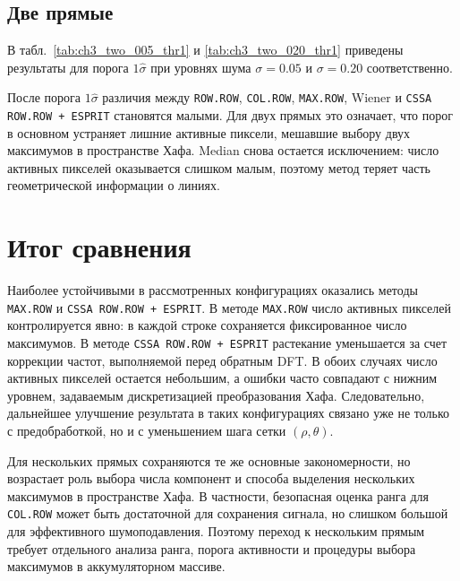 \subsection{Две прямые}

В табл.~\ref{tab:ch3_two_005_thr1} и \ref{tab:ch3_two_020_thr1} приведены
результаты для порога $1\hat\sigma$ при уровнях шума $\sigma=0.05$ и
$\sigma=0.20$ соответственно.





После порога $1\hat\sigma$ различия между \texttt{ROW.ROW},
\texttt{COL.ROW}, \texttt{MAX.ROW}, Wiener и
\texttt{CSSA ROW.ROW + ESPRIT} становятся малыми. Для двух прямых это означает,
что порог в основном устраняет лишние активные пиксели, мешавшие выбору двух
максимумов в пространстве Хафа. Median снова остается исключением: число
активных пикселей оказывается слишком малым, поэтому метод теряет часть
геометрической информации о линиях.

\section{Итог сравнения}
Наиболее устойчивыми в рассмотренных конфигурациях оказались методы
\texttt{MAX.ROW} и \texttt{CSSA ROW.ROW + ESPRIT}. В методе
\texttt{MAX.ROW} число активных пикселей контролируется явно: в каждой строке
сохраняется фиксированное число максимумов. В методе
\texttt{CSSA ROW.ROW + ESPRIT} растекание уменьшается за счет коррекции
частот, выполняемой перед обратным DFT. В обоих случаях число активных
пикселей остается небольшим, а ошибки часто совпадают с нижним
уровнем, задаваемым дискретизацией преобразования Хафа. Следовательно,
дальнейшее улучшение результата в таких конфигурациях связано уже не только с
предобработкой, но и с уменьшением шага сетки $(\rho,\theta)$.

Для нескольких прямых сохраняются те же основные закономерности, но возрастает
роль выбора числа компонент и способа выделения нескольких максимумов в
пространстве Хафа. В частности, безопасная оценка ранга для
\texttt{COL.ROW} может быть достаточной для сохранения сигнала, но слишком
большой для эффективного шумоподавления. Поэтому переход к нескольким прямым
требует отдельного анализа ранга, порога активности и процедуры выбора
максимумов в аккумуляторном массиве.
